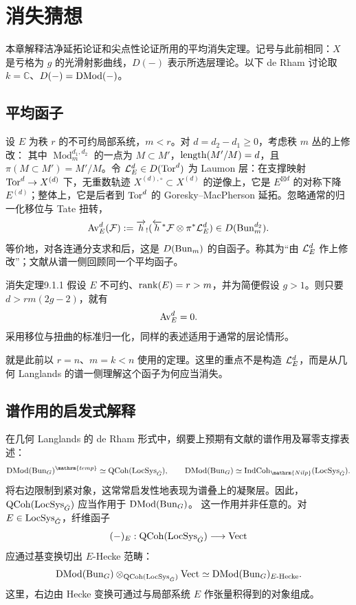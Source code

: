 \chapter{消失猜想}\label{ch:9}
\begingroup\setlength{\belowdisplayshortskip}{2pt}
本章解释洁净延拓论证和尖点性论证所用的平均消失定理\cite{Gai04,Gai16b}。记号与此前相同：$X$ 是亏格为 $g$ 的光滑射影曲线，$D(-)$ 表示所选层理论。以下 de Rham 讨论取 $k=\mathbb C$、$D(-)=\operatorname{DMod}(-)$。
\section{平均函子}\label{sec:9.1}
设 $E$ 为秩 $r$ 的不可约局部系统，$m<r$。对 $d=d_2-d_1\ge0$，考虑秩 $m$ 丛的上修改：
其中 $\operatorname{Mod}_m^{d_1,d_2}$ 的一点为 $M\subset M'$，$\operatorname{length}(M'/M)=d$，且 $\pi(M\subset M')=M'/M$。令 $\mathcal{L}_E^d\in D(\operatorname{Tor}^d)$ 为 Laumon 层：在支撑映射 $\operatorname{Tor}^d\to X^{(d)}$ 下，无重数轨迹 $X^{(d),\circ}\subset X^{(d)}$ 的逆像上，它是 $E^{\boxtimes d}$ 的对称下降 $E^{(d)}$；整体上，它是后者到 $\operatorname{Tor}^d$ 的 Goresky–MacPherson 延拓。忽略通常的归一化移位与 Tate 扭转，
\[\operatorname{Av}_E^d(\mathcal{F}):=\overrightarrow h_!(\overleftarrow h^*\mathcal{F}\otimes\pi^*\mathcal{L}_E^d)\in D(\operatorname{Bun}_m^{d_2}).\]
等价地，对各连通分支求和后，这是 $D(\operatorname{Bun}_m)$ 的自函子。称其为“由 $\mathcal{L}_E^d$ 作上修改”；文献\cite{Gai16b}从谱一侧回顾同一个平均函子。
\begin{theorem}{消失定理}{9.1.1}
假设 $E$ 不可约、$\operatorname{rank}(E)=r>m$，并为简便假设 $g>1$。则只要 $d>rm(2g-2)$，就有
\[\operatorname{Av}_E^d=0.\]
采用移位与扭曲的标准归一化，同样的表述适用于通常的层论情形。
\end{theorem}
就是此前以 $r=n$、$m=k<n$ 使用的定理。这里的重点不是构造 $\mathcal{L}_E^d$，而是从几何 Langlands 的谱一侧理解这个函子为何应当消失。
\section{谱作用的启发式解释}\label{sec:9.2}
在几何 Langlands 的 de Rham 形式中，纲要上预期有文献\cite{GR24a,AG15}的谱作用及幂零支撑表述：
\[\DMod(\Bun_G)^{\mathrm{temp}}\simeq\QCoh(\LocSys_{\checkG}),\qquad\DMod(\Bun_G)\simeq\IndCoh_{\mathrm{Nilp}}(\LocSys_{\checkG}).\]
将右边限制到紧对象，这常常启发性地表现为谱叠上的凝聚层。因此，$\operatorname{QCoh}(\operatorname{LocSys}_{\check{G}})$ 应当作用于 $\operatorname{DMod}(\operatorname{Bun}_G)$。
这一作用并非任意的。对 $E\in\operatorname{LocSys}_{\check{G}}$，纤维函子
\[(-)_E:\operatorname{QCoh}(\operatorname{LocSys}_{\check{G}})\longrightarrow\operatorname{Vect}\]
应通过基变换切出 $E$-Hecke 范畴：
\[\operatorname{DMod}(\operatorname{Bun}_G)\otimes_{\operatorname{QCoh}(\operatorname{LocSys}_{\check{G}})}\operatorname{Vect}\simeq\operatorname{DMod}(\operatorname{Bun}_G)_{E\text{-Hecke}}.\]
这里，右边由 Hecke 变换可通过与局部系统 $E$ 作张量积得到的对象组成。

